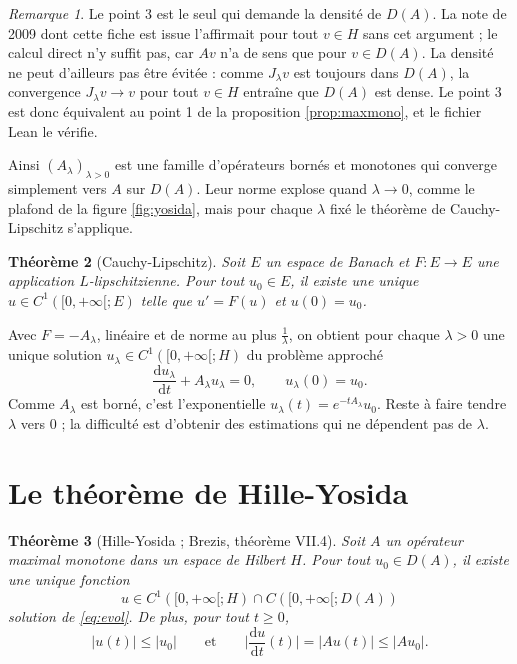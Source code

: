 \documentclass[11pt,a4paper]{article}
\theoremstyle{plain}
\newtheorem{theoreme}{Théorème}[section]
\theoremstyle{definition}
\theoremstyle{remark}
\newtheorem{remarque}[theoreme]{Remarque}
\begin{document}
\begin{remarque}
Le point 3 est le seul qui demande la densité de $D(A)$. La note de 2009 dont cette fiche est issue l'affirmait pour tout $v\in H$ sans cet argument ; le calcul direct n'y suffit pas, car $Av$ n'a de sens que pour $v\in D(A)$. La densité ne peut d'ailleurs pas être évitée : comme $J_\lambda v$ est toujours dans $D(A)$, la convergence $J_\lambda v\to v$ pour tout $v\in H$ entraîne que $D(A)$ est dense. Le point 3 est donc équivalent au point 1 de la proposition \ref{prop:maxmono}, et le fichier Lean le vérifie.
\end{remarque}

Ainsi $(A_\lambda)_{\lambda>0}$ est une famille d'opérateurs bornés et monotones qui converge simplement vers $A$ sur $D(A)$. Leur norme explose quand $\lambda\to0$, comme le plafond de la figure \ref{fig:yosida}, mais pour chaque $\lambda$ fixé le théorème de Cauchy-Lipschitz s'applique.

\begin{theoreme}[Cauchy-Lipschitz]\label{thm:cl}
Soit $E$ un espace de Banach et $F : E\to E$ une application $L$-lipschitzienne. Pour tout $u_0\in E$, il existe une unique $u\in C^1([0,+\infty[;E)$ telle que $u'=F(u)$ et $u(0)=u_0$.
\end{theoreme}

Avec $F=-A_\lambda$, linéaire et de norme au plus $\frac1\lambda$, on obtient pour chaque $\lambda>0$ une unique solution $u_\lambda\in C^1([0,+\infty[;H)$ du problème approché
\begin{equation}\label{eq:approche}
  \frac{\mathrm{d}u_\lambda}{\mathrm{d}t}+A_\lambda u_\lambda=0,\qquad u_\lambda(0)=u_0 .
\end{equation}
Comme $A_\lambda$ est borné, c'est l'exponentielle $u_\lambda(t)=e^{-tA_\lambda}u_0$. Reste à faire tendre $\lambda$ vers $0$ ; la difficulté est d'obtenir des estimations qui ne dépendent pas de $\lambda$.

\section{Le théorème de Hille-Yosida}

\begin{theoreme}[Hille-Yosida ; Brezis, théorème VII.4]\label{thm:hy}
Soit $A$ un opérateur maximal monotone dans un espace de Hilbert $H$. Pour tout $u_0\in D(A)$, il existe une unique fonction
\[
  u\in C^1([0,+\infty[;H)\cap C([0,+\infty[;D(A))
\]
solution de \eqref{eq:evol}. De plus, pour tout $t\geq0$,
\[
  |u(t)|\leq|u_0|\qquad\text{et}\qquad\Big|\frac{\mathrm{d}u}{\mathrm{d}t}(t)\Big|=|Au(t)|\leq|Au_0| .
\]
\end{theoreme}
\end{document}
